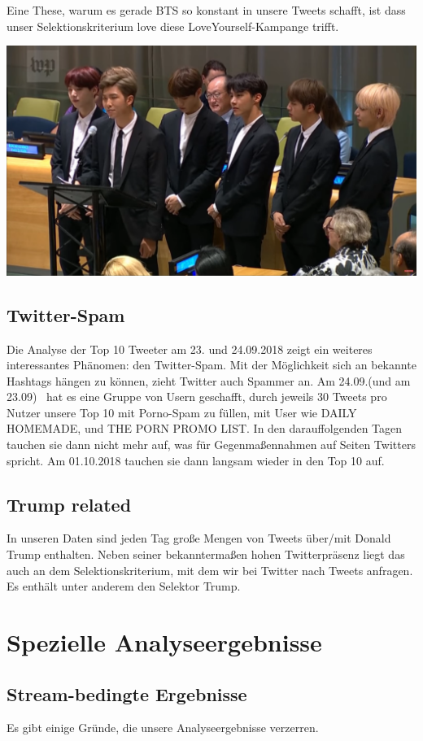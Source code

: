 Eine These, warum es gerade BTS so konstant in unsere Tweets schafft,
ist dass unser Selektionskriterium love diese LoveYourself-Kampange
trifft.

\includegraphics[width=\textwidth]{bilder/eigene20PrC3A4sentation-img4.png}

\bigskip

\subsection{Twitter-Spam}
Die Analyse der Top 10 Tweeter am 23. und 24.09.2018 zeigt ein weiteres
interessantes Phänomen: den Twitter-Spam. Mit der Möglichkeit sich an
bekannte Hashtags hängen zu können, zieht Twitter auch Spammer an. Am
24.09.(und am 23.09) \ hat es eine Gruppe von Usern geschafft, durch
jeweils 30 Tweets pro Nutzer unsere Top 10 mit Porno-Spam zu füllen,
mit User wie DAILY HOMEMADE, und THE PORN PROMO LIST. In den
darauffolgenden Tagen tauchen sie dann nicht mehr auf, was für
Gegenmaßennahmen auf Seiten Twitters spricht. Am 01.10.2018 tauchen sie
dann langsam wieder in den Top 10 auf.

\subsection{Trump related}
In unseren Daten sind jeden Tag große Mengen von Tweets über/mit Donald
Trump enthalten. Neben seiner bekanntermaßen hohen Twitterpräsenz liegt
das auch an dem Selektionskriterium, mit dem wir bei Twitter nach
Tweets anfragen. Es enthält unter anderem den Selektor Trump.

\section{Spezielle
Analyseergebnisse}
\subsection{Stream-bedingte Ergebnisse}
Es gibt einige Gründe, die unsere Analyseergebnisse verzerren.

